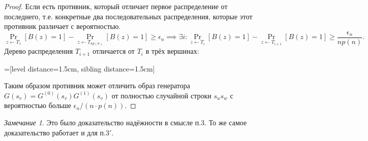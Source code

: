 \documentclass[12pt]{article}
\theoremstyle{definition}
\theoremstyle{plain}
\theoremstyle{remark}
\newtheorem{remark}{Замечание}[section]
\begin{document}
\begin{proof}
Если есть противник, который отличает первое распределение от последнего,
т.е. конкретные два последовательных распределения, которые этот
противник различает с вероятностью.
$$
\Pr_{z\gets T_1}[B(z) = 1] - \Pr_{z\gets T_{np(n)}}[B(z) = 1] \ge \epsilon_n \implies
\exists i: \Pr_{z\gets T_i}[B(z) = 1] - \Pr_{z\gets T_{i+1}}[B(z) = 1] \ge \frac{\epsilon_n}{np(n)}.
$$
Дерево распределения $T_{i+1}$ отличается от $T_i$ в трёх вершинах:
\begin{center}
=[level distance=1.5cm, sibling distance=1.5cm]
\hspace{1cm}
\end{center}
Таким образом противник может отличить образ генератора $G(s_v) = G^{(0)}(s_v)G^{(1)}(s_v)$ от полностью случайной строки $s_us_w$
с вероятностью больше $\epsilon_n/(n\cdot p(n))$.
\end{proof}
\begin{remark}
Это было доказательство надёжности в смысле п.3. 
То же самое доказательство работает и для п.$3'$. 
\end{remark}
\end{document}
